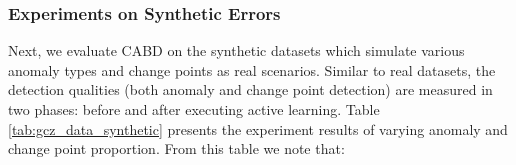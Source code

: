 \begin{table}[h]
\small
  \centering
   \small{
      \label{tab:all_evaluation_results}%
       \caption{: Evaluating Anomaly Detection (AD) and Change Point Detection (CP) qualities on Synthetic, Yahoo and IoT datasets.}
       }
\end{table}%


\subsubsection{Experiments on Synthetic Errors}

Next, we evaluate CABD on the synthetic datasets which simulate various anomaly types and change points as real scenarios. Similar to real datasets, the detection qualities (both anomaly and change point detection) are measured in two phases: before and after executing active learning. Table \ref{tab:gcz_data_synthetic} presents the experiment results of varying anomaly and change point proportion. From this table we note that:\\


